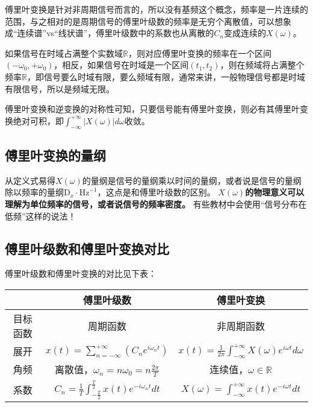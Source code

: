 傅里叶变换是针对非周期信号而言的，所以没有基频这个概念，频率是一片连续的范围，与之相对的是周期信号的傅里叶级数的频率是无穷个离散值，可以想象成“连续谱”vs“线状谱”，傅里叶级数中的系数也从离散的$C_n$变成连续的$X\left( \omega \right) $。

如果信号在时域占满整个实数域$\mathbb{R} $，则对应傅里叶变换的频率在一个区间$\left( -\omega _0,+\omega _0 \right) $，相反，如果信号在时域是一个区间$\left( t_1,t_2 \right) $，则在频域将占满整个频率$\mathbb{R} $，即信号要么时域有限，要么频域有限，通常来讲，一般物理信号都是时域有限信号，所以是频域无限。

傅里叶变换和逆变换的对称性可知，只要信号能有傅里叶变换，则必有其傅里叶变换绝对可积，即$\int_{-\infty}^{+\infty}{\left| X\left( \omega \right) \right|d\omega}$收敛。

\subsection{傅里叶变换的量纲}

从定义式易得$X\left( \omega \right) $的量纲是信号的量纲乘以时间的量纲，或者说是信号的量纲除以频率的量纲$\mathrm{D}_x\cdot \mathrm{Hz}^{-1}$，这点是和傅里叶级数的区别。
{\bf $X\left( \omega \right) $的物理意义可以理解为单位频率的信号，或者说信号的频率密度。}
有些教材中会使用“信号分布在低频”这样的说法！

\subsection{傅里叶级数和傅里叶变换对比}

傅里叶级数和傅里叶变换的对比见下表：

\begin{table}[h]
\centering
\begin{tabular}{ccc}
    \toprule
    & 傅里叶级数 & 傅里叶变换\\
    \midrule
    目标函数 & 周期函数 & 非周期函数\\
    展开 & $x\left( t \right) =\sum_{n=-\infty}^{+\infty}{\left( C_ne^{i\omega _nt} \right)}$ & $x\left( t \right) =\frac{1}{2\pi}\int_{-\infty}^{+\infty}{X\left( \omega \right) e^{i\omega t}d\omega}$\\
    角频 & 离散值，$\omega _n=n\omega _0=n\frac{2\pi}{T}$ & 连续值，$\omega \in \mathbb{R} $\\
    系数 & $C_n=\frac{1}{T}\int_{-\frac{T}{2}}^{\frac{T}{2}}{x\left( t \right) e^{-i\omega _nt}dt}$ & $X\left( \omega \right) =\int_{-\infty}^{+\infty}{x\left( t \right) e^{-i\omega t}dt}$\\
    \bottomrule
\end{tabular}
\end{table}

